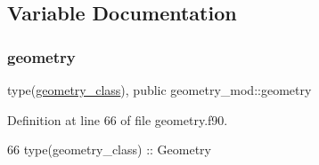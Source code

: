 \subsection{Variable Documentation}
\mbox{\label{namespacegeometry__mod_ad2ad4f7e1138beaad5f37d5c15b7b457}} 
\subsubsection{\texorpdfstring{geometry}{geometry}}
{\footnotesize\ttfamily type(\mbox{\hyperlink{structgeometry__mod_1_1geometry__class}{geometry\+\_\+class}}), public geometry\+\_\+mod\+::geometry}



Definition at line 66 of file geometry.\+f90.


\begin{DoxyCode}
66     \textcolor{keywordtype}{type}(geometry\_class) :: Geometry
\end{DoxyCode}
